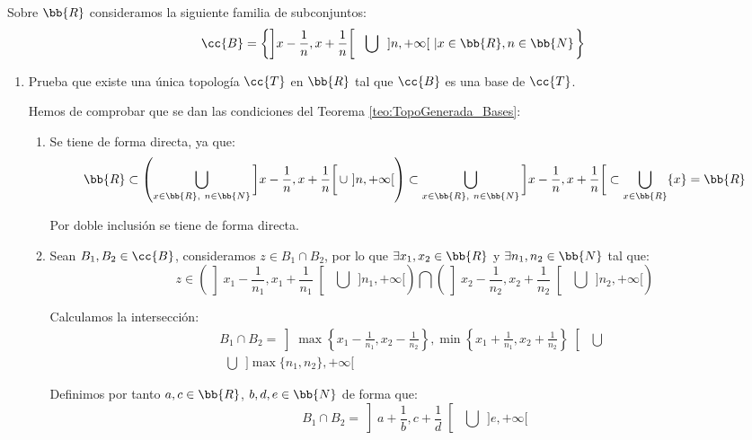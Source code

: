 \begin{ejercicio}
    Sobre $\bb{R}$ consideramos la siguiente familia de subconjuntos:
    \begin{equation*}
        \cc{B}=\left\{
        \left]x-\frac{1}{n}, x+\frac{1}{n}\right[~~
        \bigcup ~~]n,+\infty[ ~\left| x\in \bb{R}, n\in \bb{N}\right.
        \right\}
    \end{equation*}

    \begin{enumerate}[label=\alph*)]
        \item Prueba que existe una única topología $\cc{T}$ en $\bb{R}$ tal que $\cc{B}$ es una base de $\cc{T}$.

        Hemos de comprobar que se dan las condiciones del Teorema \ref{teo:TopoGenerada_Bases}:
        \begin{enumerate}
            \item[B1)] Se tiene de forma directa, ya que:
            \begin{equation*}
                \bb{R}\subset \left(\bigcup\limits_{x\in \bb{R},~n\in \bb{N}} \left]x-\frac{1}{n}, x+\frac{1}{n}\right[
                \cup~]n,+\infty[\right) \subset \bigcup\limits_{x\in \bb{R},~n\in \bb{N}} \left]x-\frac{1}{n}, x+\frac{1}{n}\right[ \subset \bigcup_{x\in \bb{R}}\{x\}=\bb{R}
            \end{equation*}

            Por doble inclusión se tiene de forma directa.

            \item[B2)] Sean $B_1,B_2\in \cc{B}$, consideramos $z\in B_1\cap B_2$, por lo que $\exists x_1,x_2\in \bb{R}$ y $\exists n_1,n_2\in \bb{N}$ tal que:
            $$z\in \left(\left]x_1-\frac{1}{n_1}, x_1+\frac{1}{n_1}\right[~~ \bigcup ~~]n_1,+\infty[\right) \bigcap \left(\left]x_2-\frac{1}{n_2}, x_2+\frac{1}{n_2}\right[~~ \bigcup ~~]n_2,+\infty[\right)$$

            Calculamos la intersección:
            \begin{multline*}
                B_1\cap B_2 = \left]\max \left\{x_1-\frac{1}{n_1}, x_2-\frac{1}{n_2}\right\}, \min \left\{x_1+\frac{1}{n_1}, x_2+\frac{1}{n_2}\right\}\right[~~\bigcup~~ \\
                ~~\bigcup~~  ]\max\{n_1,n_2\}, +\infty[
            \end{multline*}

            Definimos por tanto $a,c\in \bb{R}$, $b,d,e\in \bb{N}$ de forma que:
            \begin{equation*}
                B_1\cap B_2 = \left]a+\frac{1}{b}, c+\frac{1}{d}\right[~~\bigcup~~ ]e, +\infty[
            \end{equation*}


\end{enumerate}
\end{enumerate}
\end{ejercicio}
